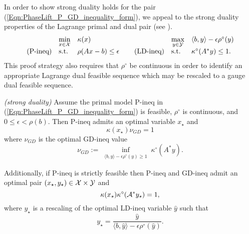 In order to show strong duality holds for the pair (\ref{Eqn:PhaseLift_P_GD_inequality_form}), we appeal to the strong duality properties of the Lagrange primal and dual pair (see \cite[Section 28]{rockafellar1970convex}).
\begin{equation}			\label{Eqn:PhaseLift_P_GD_ineq_Lagrange_dual}
\begin{array}{lllllll}
	&	\min\limits_{\substack{x \in {\mathcal X}}}
		&	\kappa(x)
			&
				&	\max\limits_{\substack{y \in {\mathcal Y}}}
					&	\langle b, y \rangle - \epsilon \rho^\circ(y)
						\\
\textnormal{(P-ineq)}
	&	\textnormal{s.t.}
		& 	\rho(Ax-b) \leq \epsilon
			&	\hspace{0.4cm} 	\textnormal{(LD-ineq)}
				&	\textnormal{s.t.}
					&	\kappa^\circ(A^*y)  \leq 1.
\end{array}
\end{equation}
This proof strategy also requires that $\rho^\circ$ be continuous in order to identify an appropriate Lagrange dual feasible sequence which may be rescaled to a gauge dual feasible sequence.

\begin{prop} \label{Prop:strong_duality}
\emph{(strong duality)}
Assume the primal model P-ineq in (\ref{Eqn:PhaseLift_P_GD_inequality_form}) is feasible, $\rho^\circ$ is continuous, and $0 \leq \epsilon < \rho(b)$.  Then P-ineq admits an optimal variable $x_\star$ and
\begin{equation} 			\label{Eqn:strong_duality_1}
\kappa(x_\star) \nu_{GD} = 1
\end{equation}
where $\nu_{GD}$ is the optimal GD-ineq value
\begin{equation}
\nu_{GD} := \inf\limits_{\substack{ \langle b, y \rangle - \epsilon \rho^\circ(y) \geq 1}} \kappa^\circ(A^*y).
\end{equation}

Additionally, if P-ineq is strictly feasible then P-ineq and GD-ineq admit an optimal pair $(x_\star, y_\star) \in {\mathcal X} \times {\mathcal Y}$ and
\begin{equation} 			\label{Eqn:strong_duality_2}
\kappa(x_\star) \kappa^\circ ( {\mathcal A}^* y_\star ) = 1,
\end{equation}
where $y_\star$ is a rescaling of the optimal LD-ineq variable $\hat{y}$ such that
\begin{equation} 			\label{Eqn:strong_duality_3}
y_\star = \frac{\hat{y}}{\langle b, \hat{y} \rangle - \epsilon \rho^\circ(\hat{y})}.
\end{equation}
\end{prop}

